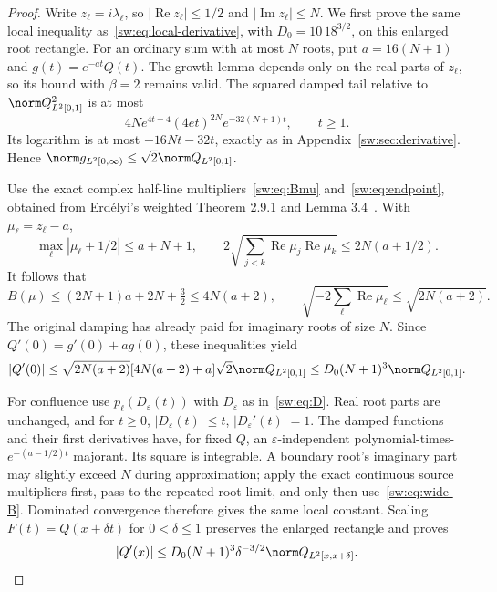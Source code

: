 \documentclass[11pt,a4paper]{article}
\numberwithin{equation}{section}
\theoremstyle{definition}\newtheorem{definition}[theorem]{Definition}
\theoremstyle{remark}\newtheorem{remark}[theorem]{Remark}
\DeclareMathOperator{\Rea}{Re}\DeclareMathOperator{\Ima}{Im}
\begin{document}
\begin{proof}
Write $z_\ell=i\lambda_\ell$, so $|\Rea z_\ell|\le1/2$ and $|\Ima z_\ell|\le N$. We first prove the same local inequality as~\eqref{sw:eq:local-derivative}, with $D_0=10\,18^{3/2}$, on this enlarged root rectangle.
For an ordinary sum with at most $N$ roots, put $a=16(N+1)$ and $g(t)=e^{-at}Q(t)$. The growth lemma depends only on the real parts of $z_\ell$, so its bound with $\beta=2$ remains valid. The squared damped tail relative to $\norm Q_{L^2[0,1]}^2$ is at most
\[
 4Ne^{4t+4}(4et)^{2N}e^{-32(N+1)t},\qquad t\ge1.
\]
Its logarithm is at most $-16Nt-32t$, exactly as in Appendix~\ref{sw:sec:derivative}. Hence $\norm g_{L^2[0,\infty)}\le\sqrt2\norm Q_{L^2[0,1]}$.

Use the exact complex half-line multipliers~\eqref{sw:eq:Bmu} and~\eqref{sw:eq:endpoint}, obtained from Erd\'elyi's weighted Theorem 2.9.1 and Lemma 3.4~\cite{Erdelyi}. With $\mu_\ell=z_\ell-a$,
\[
 \max_\ell|\mu_\ell+1/2|\le a+N+1,\qquad
 2\sqrt{\sum_{j<k}\Rea\mu_j\Rea\mu_k}\le2N(a+1/2).
\]
It follows that
\begin{equation}\label{sw:eq:wide-B}
 B(\mu)\le(2N+1)a+2N+\tfrac32\le4N(a+2),\qquad
 \sqrt{-2\sum_\ell\Rea\mu_\ell}\le\sqrt{2N(a+2)}.
\end{equation}
The original damping has already paid for imaginary roots of size $N$. Since $Q'(0)=g'(0)+ag(0)$, these inequalities yield
\[
 |Q'(0)|\le\sqrt{2N(a+2)}[4N(a+2)+a]\sqrt2\norm Q_{L^2[0,1]}
 \le D_0(N+1)^3\norm Q_{L^2[0,1]}.
\]

For confluence use $p_\ell(D_\varepsilon(t))$ with $D_\varepsilon$ as in~\eqref{sw:eq:D}. Real root parts are unchanged, and for $t\ge0$,
$|D_\varepsilon(t)|\le t$, $|D_\varepsilon'(t)|=1$. The damped functions and their first derivatives have, for fixed $Q$, an $\varepsilon$-independent polynomial-times-$e^{-(a-1/2)t}$ majorant. Its square is integrable. A boundary root's imaginary part may slightly exceed $N$ during approximation; apply the exact continuous source multipliers first, pass to the repeated-root limit, and only then use~\eqref{sw:eq:wide-B}. Dominated convergence therefore gives the same local constant. Scaling $F(t)=Q(x+\delta t)$ for $0<\delta\le1$ preserves the enlarged rectangle and proves
\begin{equation}\label{sw:eq:wide-local}
 |Q'(x)|\le D_0(N+1)^3\delta^{-3/2}\norm Q_{L^2[x,x+\delta]}.
\end{equation}


\end{proof}
\end{document}
